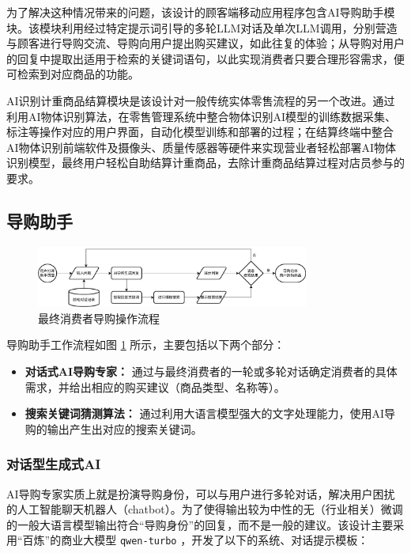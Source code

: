 为了解决这种情况带来的问题，该设计的顾客端移动应用程序包含AI导购助手模块。该模块利用经过特定提示词引导的多轮LLM对话及单次LLM调用，分别营造与顾客进行导购交流、导购向用户提出购买建议，如此往复的体验；从导购对用户的回复中提取出适用于检索的关键词语句，以此实现消费者只要合理形容需求，便可检索到对应商品的功能。

AI识别计重商品结算模块是该设计对一般传统实体零售流程的另一个改进。通过利用AI物体识别算法，在零售管理系统中整合物体识别AI模型的训练数据采集、标注等操作对应的用户界面，自动化模型训练和部署的过程；在结算终端中整合AI物体识别前端软件及摄像头、质量传感器等硬件来实现营业者轻松部署AI物体识别模型，最终用户轻松自助结算计重商品，去除计重商品结算过程对店员参与的要求。

\subsection{导购助手}

\begin{figure}[htbp]
	\centering
	\includegraphics[width=0.8\textwidth]{./imgs/ask-n-choose.png}
	\caption{最终消费者导购操作流程}
	\label{fig:ask-n-choose}
\end{figure}

导购助手工作流程如图 \ref{fig:ask-n-choose} 所示，主要包括以下两个部分：

\begin{itemize}
    \item \textbf{对话式AI导购专家：} 通过与最终消费者的一轮或多轮对话确定消费者的具体需求，并给出相应的购买建议（商品类型、名称等）。
    \item \textbf{搜索关键词猜测算法：} 通过利用大语言模型强大的文字处理能力，使用AI导购的输出产生出对应的搜索关键词。
\end{itemize}

\subsubsection{对话型生成式AI}

AI导购专家实质上就是扮演导购身份，可以与用户进行多轮对话，解决用户困扰的人工智能聊天机器人（chatbot）。为了使得输出较为中性的无（行业相关）微调的一般大语言模型输出符合“导购身份”的回复，而不是一般的建议。该设计主要采用“百炼”的商业大模型 \verb|qwen-turbo| ，开发了以下的系统、对话提示模板：

